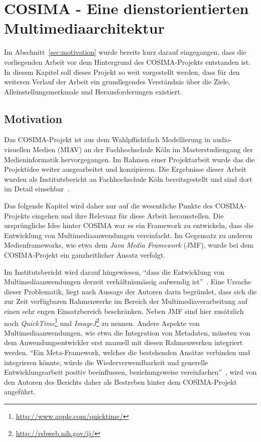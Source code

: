 
\chapter{COSIMA - Eine dienstorientierten Multimediaarchitektur} %
\label{cha:eine_dienstorientierten_multimediaarchitektur}

  Im Abschnitt~\ref{sec:motivation} wurde bereits kurz darauf eingegangen, dass die vorliegenden Arbeit vor dem Hintergrund des COSIMA-Projekts entstanden ist. In diesem Kapitel soll dieses Projekt so weit vorgestellt werden, dass für den weiteren Verlauf der Arbeit ein grundlegendes Verständnis über die Ziele, Alleinstellungsmerkmale und Herausforderungen existiert.
  
\section{Motivation} %
\label{sec:motivation_cosima}

  Das COSIMA-Projekt ist aus dem Wahlpflichtfach Modellierung in audio-visuellen Medien (MIAV) an der Fachhochschule Köln im Masterstudiengang der Medieninformatik hervorgegangen. Im Rahmen einer Projektarbeit wurde das die Projektidee weiter ausgearbeitet und konzipieren. Die Ergebnisse dieser Arbeit wurden als Institutsbericht an Fachhochschule Köln bereitsgestellt und sind dort im Detail einsehbar~\citep{bericht}.
  
  Das folgende Kapitel wird daher nur auf die wesentliche Punkte des COSIMA-Projekts eingehen und ihre Relevanz für diese Arbeit herausstellen. Die ursprüngliche Idee hinter COSIMA war es ein Framework zu entwickeln, dass die Entwicklung von Multimediaanwendungen vereinfacht. Im Gegensatz zu anderen Medienframeworks, wie etwa dem \emph{Java Media Framework} (JMF), wurde bei dem COSIMA-Projekt ein ganzheitlicher Ansatz verfolgt.
  
  Im Institutsbericht wird darauf hingewiesen, "`dass die Entwicklung von Multimediaanwendungen derzeit verhältnismässig aufwendig ist"'~\citep[S. 2]{bericht}. Eine Ursache dieser Problematik, liegt nach Aussage der Autoren darin begründet, dass sich die zur Zeit verfügbaren Rahmenwerke im Bereich der Multimediaverarbeitung auf einen sehr engen Einsatzbereich beschränken. Neben JMF sind hier zusätzlich noch \emph{QuickTime}\footnote{\url{http://www.apple.com/quicktime/}} und \emph{ImageJ}\footnote{\url{http://rsbweb.nih.gov/ij/}} zu nennen. Andere Aspekte von Multimediaanwendungen, wie etwa die Integration von Metadaten, müssten von dem Anwendungsentwickler erst manuell mit diesen Rahmenwerken integriert werden. "`Ein Meta-Framework, welches die bestehenden Ansätze verbinden und integrieren könnte, würde die Wiederverwendbarkeit und generelle Entwicklungsarbeit positiv beeinflussen, beziehungsweise vereinfachen"'~\citep[S. 3]{bericht}, wird von den Autoren des Berichts daher als Bestreben hinter dem COSIMA-Projekt angeführt.
  
